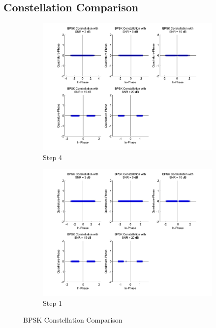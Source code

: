 \documentclass[]{article}
\begin{document}
\newpage
\subsection{Constellation Comparison}

\begin{figure}[h]
        \centering
        \begin{subfigure}[b]{0.6\textwidth}
                \includegraphics[width=\textwidth]{bpConst.jpg}
                \caption{Step 4}
                \label{fig:bpConst}
        \end{subfigure}%
        \qquad \quad %
        \begin{subfigure}[b]{0.6\textwidth}
                \includegraphics[width=\textwidth]{bpConst1.jpg}
                \caption{Step 1}
                \label{fig:bpConst1}
        \end{subfigure}
        \caption{BPSK Constellation Comparison }
\end{figure}
\end{document}
